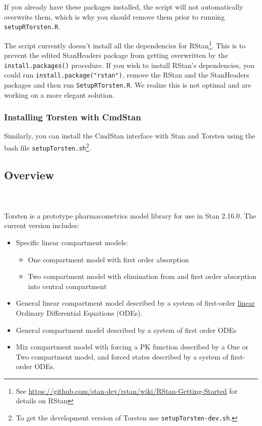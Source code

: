 \documentclass[11pt]{amsart}
\begin{document}
If you already have these packages installed, the script will not automatically overwrite them, which is why you should remove them prior to running \texttt{setupRTorsten.R}. 

The script currently doesn't install all the dependencies for RStan\footnote{See \url{https://github.com/stan-dev/rstan/wiki/RStan-Getting-Started} for details on RStan}. This is to prevent the edited StanHeaders package from getting overwritten by the \texttt{install.packages()} procedure. If you wish to install RStan's dependencies, you could run \texttt{install.package("rstan")}, remove the RStan and the StanHeaders packages and then run \texttt{SetupRTorsten.R}. We realize this is not optimal and are working on a more elegant solution.

\subsubsection{Installing Torsten with CmdStan} Similarly, you can install the CmdStan interface with Stan and Torsten using the bash file \texttt{setupTorsten.sh}\footnote{To get the development version of Torsten use \texttt{setupTorsten-dev.sh}.}.

\subsection{Overview} \ \\ \ \\
Torsten is a prototype pharmacometrics model library for use in Stan 2.16.0. The current version includes:
\begin{itemize}
  \item Specific linear compartment models:
  \begin{itemize}
    \item One compartment model with first order absorption
    \item Two compartment model with elimination from and first order absorption into central compartment
  \end{itemize}
  \item General linear compartment model described by a system of first-order \underline{linear} Ordinary Differential Equations (ODEs).
  \item General compartment model described by a system of first order ODEs
  \item Mix compartment model with forcing a PK function described by a One or Two compartment model, and forced states described by a system of first-order ODEs.
 \end{itemize}
\end{document}
